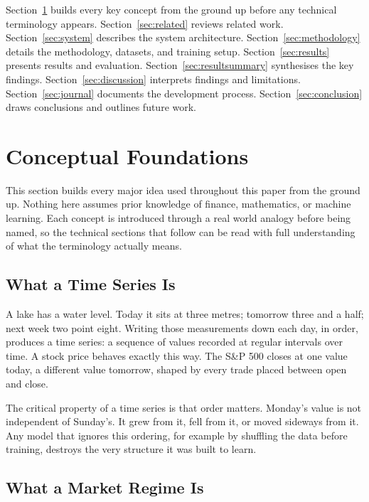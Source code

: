 \documentclass[journal]{IEEEtran}
\begin{document}
Section~\ref{sec:concepts} builds every key concept from the ground up
before any technical terminology appears. Section~\ref{sec:related}
reviews related work. Section~\ref{sec:system} describes the system
architecture. Section~\ref{sec:methodology} details the methodology,
datasets, and training setup. Section~\ref{sec:results} presents
results and evaluation. Section~\ref{sec:resultsummary} synthesises
the key findings. Section~\ref{sec:discussion} interprets findings
and limitations. Section~\ref{sec:journal} documents the development
process. Section~\ref{sec:conclusion} draws conclusions and outlines
future work.

\section{Conceptual Foundations}
\label{sec:concepts}

This section builds every major idea used throughout this paper from
the ground up. Nothing here assumes prior knowledge of finance,
mathematics, or machine learning. Each concept is introduced through
a real world analogy before being named, so the technical sections that
follow can be read with full understanding of what the terminology
actually means.

\subsection{What a Time Series Is}

A lake has a water level. Today it sits at three metres; tomorrow three
and a half; next week two point eight. Writing those measurements down
each day, in order, produces a time series: a sequence of values recorded
at regular intervals over time. A stock price behaves exactly this way.
The S\&P 500 closes at one value today, a different value tomorrow,
shaped by every trade placed between open and close.

The critical property of a time series is that order matters. Monday's
value is not independent of Sunday's. It grew from it, fell from it, or
moved sideways from it. Any model that ignores this ordering, for example
by shuffling the data before training, destroys the very structure it was
built to learn.

\subsection{What a Market Regime Is}
\end{document}
